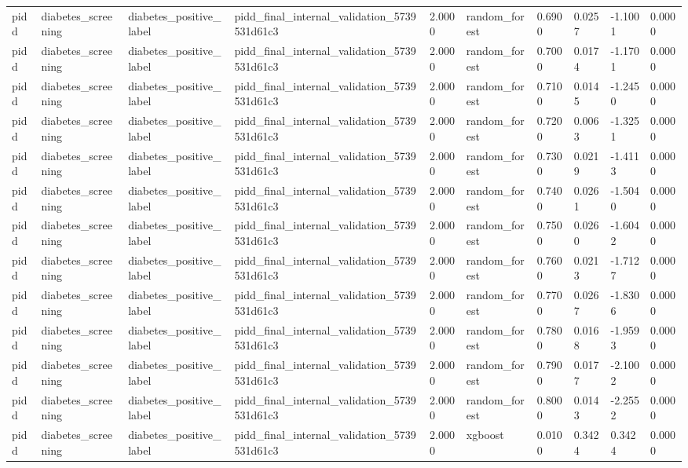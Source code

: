 \begin{tabular}{llllllllll}
pidd & diabetes\_screening & diabetes\_positive\_label & pidd\_final\_internal\_validation\_5739531d61c3 & 2.0000 & random\_forest & 0.6900 & 0.0257 & -1.1001 & 0.0000 \\
pidd & diabetes\_screening & diabetes\_positive\_label & pidd\_final\_internal\_validation\_5739531d61c3 & 2.0000 & random\_forest & 0.7000 & 0.0174 & -1.1701 & 0.0000 \\
pidd & diabetes\_screening & diabetes\_positive\_label & pidd\_final\_internal\_validation\_5739531d61c3 & 2.0000 & random\_forest & 0.7100 & 0.0145 & -1.2450 & 0.0000 \\
pidd & diabetes\_screening & diabetes\_positive\_label & pidd\_final\_internal\_validation\_5739531d61c3 & 2.0000 & random\_forest & 0.7200 & 0.0063 & -1.3251 & 0.0000 \\
pidd & diabetes\_screening & diabetes\_positive\_label & pidd\_final\_internal\_validation\_5739531d61c3 & 2.0000 & random\_forest & 0.7300 & 0.0219 & -1.4113 & 0.0000 \\
pidd & diabetes\_screening & diabetes\_positive\_label & pidd\_final\_internal\_validation\_5739531d61c3 & 2.0000 & random\_forest & 0.7400 & 0.0261 & -1.5040 & 0.0000 \\
pidd & diabetes\_screening & diabetes\_positive\_label & pidd\_final\_internal\_validation\_5739531d61c3 & 2.0000 & random\_forest & 0.7500 & 0.0260 & -1.6042 & 0.0000 \\
pidd & diabetes\_screening & diabetes\_positive\_label & pidd\_final\_internal\_validation\_5739531d61c3 & 2.0000 & random\_forest & 0.7600 & 0.0213 & -1.7127 & 0.0000 \\
pidd & diabetes\_screening & diabetes\_positive\_label & pidd\_final\_internal\_validation\_5739531d61c3 & 2.0000 & random\_forest & 0.7700 & 0.0267 & -1.8306 & 0.0000 \\
pidd & diabetes\_screening & diabetes\_positive\_label & pidd\_final\_internal\_validation\_5739531d61c3 & 2.0000 & random\_forest & 0.7800 & 0.0168 & -1.9593 & 0.0000 \\
pidd & diabetes\_screening & diabetes\_positive\_label & pidd\_final\_internal\_validation\_5739531d61c3 & 2.0000 & random\_forest & 0.7900 & 0.0177 & -2.1002 & 0.0000 \\
pidd & diabetes\_screening & diabetes\_positive\_label & pidd\_final\_internal\_validation\_5739531d61c3 & 2.0000 & random\_forest & 0.8000 & 0.0143 & -2.2552 & 0.0000 \\
pidd & diabetes\_screening & diabetes\_positive\_label & pidd\_final\_internal\_validation\_5739531d61c3 & 2.0000 & xgboost & 0.0100 & 0.3424 & 0.3424 & 0.0000 \\

\end{tabular}

